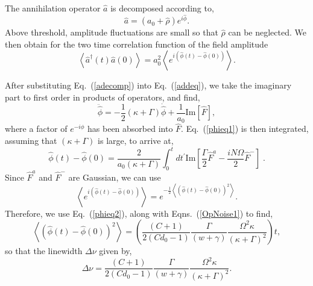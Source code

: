 \documentclass[aps,
twocolumn,
showpacs,
superscriptaddress,groupedaddress]{revtex4}
\begin{document}
The annihilation operator $\hat{a}$ is decomposed according to,
\begin{equation}
\hat{a}= (a_0 + \hat{\rho}) e^{i\hat{\phi}}.
\label{adecomp}
\end{equation}
Above threshold, amplitude fluctuations are small so that $\hat\rho$
can be neglected.  We then obtain for the two time correlation function
of the field amplitude
\begin{equation}
\left< \hat{a}^{\dagger}(t) \hat{a}(0) \right> =
a_0^2 \left< e^{i(\hat{\phi}(t) - \hat{\phi}(0))} \right>.
\end{equation}

After substituting Eq.~(\ref{adecomp}) into Eq.~(\ref{addeq}), we take
the imaginary part to first order in products of operators, and find,
\begin{equation}
\ddot{\hat{\phi}} =
-\frac{1}{2}(\kappa+\Gamma) \dot{\hat{\phi}} +
\frac{1}{a_0} \text{Im} [\hat{F}],
\label{phieq1}
\end{equation}
where a factor of $e^{-i\phi}$ has been absorbed into $\hat{F}$.
Eq.~(\ref{phieq1}) is then integrated, assuming that $(\kappa+\Gamma)$
is large, to arrive at,
\begin{equation}
\hat{\phi}(t) - \hat{\phi}(0) =
\frac{2}{a_0 (\kappa+\Gamma)}
\int_0^t dt^{\prime} \text{Im}
\left[ \frac{\Gamma}{2} \hat{F}^a-\frac{i N \Omega}{2} \hat{F}^-\right]\;.
\label{phieq2}
\end{equation}
Since $ \hat{F}^a$ and $\hat{F}^-$ are Gaussian, we can use
\begin{equation}
\left< e^{i(\hat{\phi}(t) - \hat{\phi}(0))} \right> =
e^{-\frac{1}{2}\left< ( \hat{\phi}(t) - \hat{\phi}(0) )^2 \right>}.
\end{equation}
Therefore, we use Eq.~(\ref{phieq2}), along with Eqns.~(\ref{OpNoise1})
to find,
\begin{equation}
\left<(\hat{\phi}(t) - \hat{\phi}(0))^2 \right> =
\left(\frac{(C+1)}{2(Cd_0-1)} \frac{\Gamma}{(w+\gamma)}
\frac{\Omega^2 \kappa}{(\kappa+\Gamma)^2}\right) t,
\end{equation}
so that the linewidth $\Delta \nu$ given by,
\begin{equation}
\Delta \nu =
\frac{(C+1)}{2(Cd_0-1)} \frac{\Gamma}{(w+\gamma)}
\frac{\Omega^2 \kappa}{(\kappa+\Gamma)^2}.
\label{LWHaken}
\end{equation}



\end{document}
